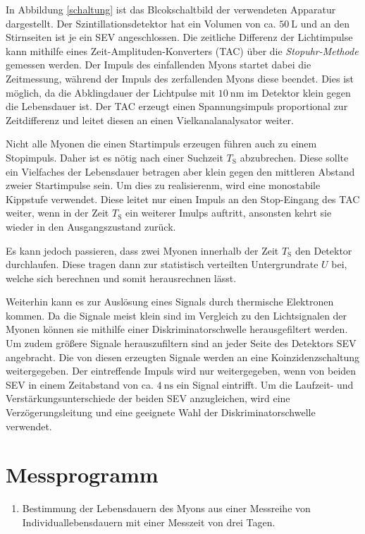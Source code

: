 In Abbildung \ref{schaltung} ist das Blcokschaltbild der verwendeten Apparatur dargestellt.
Der Szintillationsdetektor hat ein Volumen von ca. $\SI{50}{\liter}$ und an den Stirnseiten ist je ein SEV angeschlossen.
Die zeitliche Differenz der Lichtimpulse kann mithilfe eines Zeit-Amplituden-Konverters (TAC) über die \textit{Stopuhr-Methode} gemessen werden.
Der Impuls des einfallenden Myons startet dabei die Zeitmessung, während der Impuls des zerfallenden Myons diese beendet.
Dies ist möglich, da die Abklingdauer der Lichtpulse mit $\SI{10}{\nano\meter}$ im Detektor klein gegen die Lebensdauer ist.
Der TAC erzeugt einen Spannungsimpuls proportional zur Zeitdifferenz und leitet diesen an einen Vielkanalanalysator weiter.

Nicht alle Myonen die einen Startimpuls erzeugen führen auch zu einem Stopimpuls.
Daher ist es nötig nach einer Suchzeit $T_\text{S}$ abzubrechen.
Diese sollte ein Vielfaches der Lebensdauer betragen aber klein gegen den mittleren Abstand zweier Startimpulse sein.
Um dies zu realisierenm, wird eine monostabile Kippstufe verwendet. 
Diese leitet nur einen Impuls an den Stop-Eingang des TAC weiter, wenn in der Zeit $T_\text{S}$ ein weiterer Imulps auftritt, ansonsten kehrt sie wieder in den Ausgangszustand zurück.

Es kann jedoch passieren, dass zwei Myonen innerhalb der Zeit $T_\text{S}$ den Detektor durchlaufen.
Diese tragen dann zur statistisch verteilten Untergrundrate $U$ bei, welche sich berechnen und somit herausrechnen lässt.

Weiterhin kann es zur Auslösung eines Signals durch thermische Elektronen kommen.
Da die Signale meist klein sind im Vergleich zu den Lichtsignalen der Myonen können sie mithilfe einer Diskriminatorschwelle herausgefiltert werden.
Um zudem größere Signale herauszufiltern sind an jeder Seite des Detektors SEV angebracht.
Die von diesen erzeugten Signale werden an eine Koinzidenzschaltung weitergegeben.
Der eintreffende Impuls wird nur weitergegeben, wenn von beiden SEV in einem Zeitabstand von ca. $\SI{4}{\nano\second}$ ein Signal eintrifft.
Um die Laufzeit- und Verstärkungsunterschiede der beiden SEV anzugleichen, wird eine Verzögerungsleitung und eine geeignete Wahl der Diskriminatorschwelle verwendet.
\FloatBarrier
\section{Messprogramm} %
\label{sec:messprogramm}

\begin{enumerate}
	\item Bestimmung der Lebensdauern des Myons aus einer Messreihe von Individuallebensdauern mit einer Messzeit von drei Tagen.
\end{enumerate}